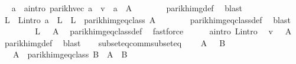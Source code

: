 \begin{isabellebody}
\ \isamarkupfalse%
\ a\ \ a{\isacharunderscore}{\kern0pt}intro{\isacharcolon}{\kern0pt}\ {\isachardoublequoteopen}parikh{\isacharunderscore}{\kern0pt}vec\ a\ {\isacharequal}{\kern0pt}\ v\ {\isasymand}\ a\ {\isasymin}\ {\isacharquery}{\kern0pt}A{\isacharprime}{\kern0pt}{\isachardoublequoteclose}\isanewline
\ \ \ \ \ \ \isamarkupfalse%
\ parikh{\isacharunderscore}{\kern0pt}img{\isacharunderscore}{\kern0pt}def\ \isamarkupfalse%
\ blast\isanewline
\ \ \ \ \isamarkupfalse%
\ \isamarkupfalse%
\ L\ \ L{\isacharunderscore}{\kern0pt}intro{\isacharcolon}{\kern0pt}\ {\isachardoublequoteopen}a\ {\isasymin}\ L\ {\isasymand}\ L\ {\isasymin}\ parikh{\isacharunderscore}{\kern0pt}img{\isacharunderscore}{\kern0pt}eq{\isacharunderscore}{\kern0pt}class\ A{\isachardoublequoteclose}\isanewline
\ \ \ \ \ \ \isamarkupfalse%
\ parikh{\isacharunderscore}{\kern0pt}img{\isacharunderscore}{\kern0pt}eq{\isacharunderscore}{\kern0pt}class{\isacharunderscore}{\kern0pt}def\ \isamarkupfalse%
\ blast\isanewline
\ \ \ \ \isamarkupfalse%
\ \isamarkupfalse%
\ {\isachardoublequoteopen}{\isasymPsi}\ L\ {\isacharequal}{\kern0pt}\ {\isasymPsi}\ A{\isachardoublequoteclose}\ \isamarkupfalse%
\ parikh{\isacharunderscore}{\kern0pt}img{\isacharunderscore}{\kern0pt}eq{\isacharunderscore}{\kern0pt}class{\isacharunderscore}{\kern0pt}def\ \isamarkupfalse%
\ fastforce\isanewline
\ \ \ \ \isamarkupfalse%
\ a{\isacharunderscore}{\kern0pt}intro\ L{\isacharunderscore}{\kern0pt}intro\ \isamarkupfalse%
\ {\isachardoublequoteopen}v\ {\isasymin}\ {\isasymPsi}\ A{\isachardoublequoteclose}\ \isamarkupfalse%
\ parikh{\isacharunderscore}{\kern0pt}img{\isacharunderscore}{\kern0pt}def\ \isamarkupfalse%
\ blast\isanewline
\ \ \isamarkupfalse%
\isanewline
{}\isamarkupfalse%
%
\endisatagproof
{\isafoldproof}%
%
\isadelimproof
\isanewline
%
\endisadelimproof
\isanewline
{}\isamarkupfalse%
\ subseteq{\isacharunderscore}{\kern0pt}comm{\isacharunderscore}{\kern0pt}subseteq{\isacharcolon}{\kern0pt}\isanewline
\ \ \ {\isachardoublequoteopen}{\isasymPsi}\ A\ {\isasymsubseteq}\ {\isasymPsi}\ B{\isachardoublequoteclose}\isanewline
\ \ \ {\isachardoublequoteopen}A\ {\isasymsubseteq}\ {\isasymUnion}{\isacharparenleft}{\kern0pt}parikh{\isacharunderscore}{\kern0pt}img{\isacharunderscore}{\kern0pt}eq{\isacharunderscore}{\kern0pt}class\ B{\isacharparenright}{\kern0pt}{\isachardoublequoteclose}\ {\isacharparenleft}{\kern0pt}\ {\isachardoublequoteopen}A\ {\isasymsubseteq}\ {\isacharquery}{\kern0pt}B{\isacharprime}{\kern0pt}{\isachardoublequoteclose}{\isacharparenright}{\kern0pt}\isanewline

\end{isabellebody}
